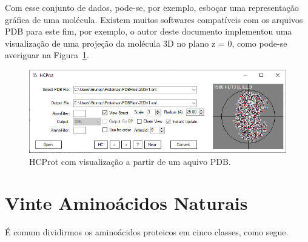 Com esse conjunto de dados, pode-se, por exemplo, esboçar uma representação gráfica de uma molécula. Existem muitos softwares compatíveis com os arquivos PDB para este fim, por exemplo, o autor deste documento implementou uma visualização de uma projeção da molécula 3D no plano z = 0, como pode-se averiguar na Figura~\ref{fig:molproj}.

\begin{figure}[H]
	\begin{center}
		\includegraphics[width=1\linewidth]{secProteins/figures/molproj.png}
	\end{center}
	\caption{HCProt com visualização a partir de um aquivo PDB.}
	\label{fig:molproj}
\end{figure}

\chapter{Vinte Aminoácidos Naturais} 

É comum dividirmos os aminoácidos proteicos em cinco classes, como segue.
